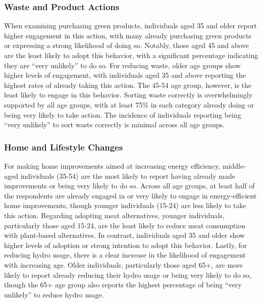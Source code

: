 \documentclass[
  letterpaper,
  DIV=11,
  numbers=noendperiod]{scrartcl}
\begin{document}
\subsubsection{Waste and Product
Actions}\label{waste-and-product-actions-1}

When examining purchasing green products, individuals aged 35 and older
report higher engagement in this action, with many already purchasing
green products or expressing a strong likelihood of doing so. Notably,
those aged 45 and above are the least likely to adopt this behavior,
with a significant percentage indicating they are ``very unlikely'' to
do so. For reducing waste, older age groups show higher levels of
engagement, with individuals aged 35 and above reporting the highest
rates of already taking this action. The 45-54 age group, however, is
the least likely to engage in this behavior. Sorting waste correctly is
overwhelmingly supported by all age groups, with at least 75\% in each
category already doing or being very likely to take action. The
incidence of individuals reporting being ``very unlikely'' to sort waste
correctly is minimal across all age groups.

\subsubsection{Home and Lifestyle
Changes}\label{home-and-lifestyle-changes-1}

For making home improvements aimed at increasing energy efficiency,
middle-aged individuals (35-54) are the most likely to report having
already made improvements or being very likely to do so. Across all age
groups, at least half of the respondents are already engaged in or very
likely to engage in energy-efficient home improvements, though younger
individuals (15-24) are less likely to take this action. Regarding
adopting meat alternatives, younger individuals, particularly those aged
15-24, are the least likely to reduce meat consumption with plant-based
alternatives. In contrast, individuals aged 35 and older show higher
levels of adoption or strong intention to adopt this behavior. Lastly,
for reducing hydro usage, there is a clear increase in the likelihood of
engagement with increasing age. Older individuals, particularly those
aged 65+, are more likely to report already reducing their hydro usage
or being very likely to do so, though the 65+ age group also reports the
highest percentage of being ``very unlikely'' to reduce hydro usage.
\end{document}
